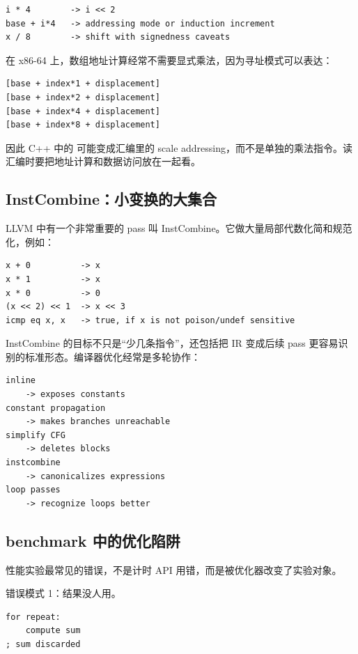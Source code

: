\begin{lstlisting}
i * 4        -> i << 2
base + i*4   -> addressing mode or induction increment
x / 8        -> shift with signedness caveats
\end{lstlisting}

在 x86-64 上，数组地址计算经常不需要显式乘法，因为寻址模式可以表达：

\begin{lstlisting}
[base + index*1 + displacement]
[base + index*2 + displacement]
[base + index*4 + displacement]
[base + index*8 + displacement]
\end{lstlisting}

因此 C++ 中的  可能变成汇编里的 scale addressing，而不是单独的乘法指令。读汇编时要把地址计算和数据访问放在一起看。

\subsection{InstCombine：小变换的大集合}

LLVM 中有一个非常重要的 pass 叫 InstCombine。它做大量局部代数化简和规范化，例如：

\begin{lstlisting}
x + 0          -> x
x * 1          -> x
x * 0          -> 0
(x << 2) << 1  -> x << 3
icmp eq x, x   -> true, if x is not poison/undef sensitive
\end{lstlisting}

InstCombine 的目标不只是“少几条指令”，还包括把 IR 变成后续 pass 更容易识别的标准形态。编译器优化经常是多轮协作：

\begin{lstlisting}
inline
    -> exposes constants
constant propagation
    -> makes branches unreachable
simplify CFG
    -> deletes blocks
instcombine
    -> canonicalizes expressions
loop passes
    -> recognize loops better
\end{lstlisting}

\subsection{benchmark 中的优化陷阱}

性能实验最常见的错误，不是计时 API 用错，而是被优化器改变了实验对象。

错误模式 1：结果没人用。

\begin{lstlisting}
for repeat:
    compute sum
; sum discarded
\end{lstlisting}


